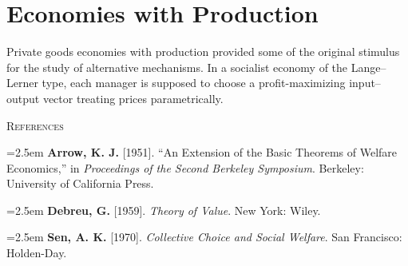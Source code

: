 \documentclass[12pt]{article}
\newcommand{\bibentry}[1]{\noindent\hangindent=2.5em\hangafter=1 \small #1 \par\vspace{0.6em}}
\begin{document}
\section*{Economies with Production}

Private goods economies with production provided some of the original stimulus for the study of alternative mechanisms. In a socialist economy of the Lange--Lerner type, each manager is supposed to choose a profit-maximizing input--output vector treating prices parametrically.

\vspace{2cm}

\begin{center}
    {\large\scshape\color{MidnightBlue} References}
    \vspace{0.5cm}
\end{center}

\bibentry{\textbf{Arrow, K. J.} [1951]. ``An Extension of the Basic Theorems of Welfare Economics,'' in \textit{Proceedings of the Second Berkeley Symposium}. Berkeley: University of California Press.}

\bibentry{\textbf{Debreu, G.} [1959]. \textit{Theory of Value}. New York: Wiley.}

\bibentry{\textbf{Sen, A. K.} [1970]. \textit{Collective Choice and Social Welfare}. San Francisco: Holden-Day.}
\end{document}
